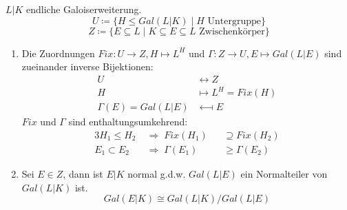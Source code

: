 \documentclass[../main.tex]{subfiles}
\begin{document}
\begin{theorem}[Hauptsatz]\label{theo:3.4}
    $L|K$ endliche Galoiserweiterung.
    $$U \coloneqq \{H\leq Gal(L|K) \mid H \text{ Untergruppe}\}$$
    $$Z\coloneqq \{E\subseteq L \mid K\subseteq E \subseteq L \text{ Zwischenkörper}\}$$
    \begin{enumerate}[label=\alph*)]
        \item Die Zuordnungen $Fix: U \rightarrow Z, H\mapsto L^H$ und $\Gamma: Z\rightarrow U, E \mapsto Gal(L|E)$
        sind zueinander inverse Bijektionen:
        \begin{align*}
            U &\longleftrightarrow Z\\
            H &\longmapsto L^H = Fix(H)\\
            \Gamma(E) = Gal(L|E) &\longmapsfrom  E 
        \end{align*}
        $Fix$ und $\Gamma$ sind enthaltungsumkehrend:
        \begin{alignat*}{3}
            H_1\leq H_2\;&\Rightarrow\; Fix(H_1) &&\supseteq Fix(H_2)\\
            E_1\subset E_2\;&\Rightarrow\; \Gamma(E_1) &&\geq \Gamma(E_2)
        \end{alignat*}
        \item Sei $E \in Z$, dann ist $E|K$ normal g.d.w. $Gal(L|E)$ ein Normalteiler von $Gal(L|K)$ ist.
        $$ Gal(E|K) \cong Gal(L|K)/Gal(L|E)$$
    \end{enumerate}
\end{theorem}
\end{document}
